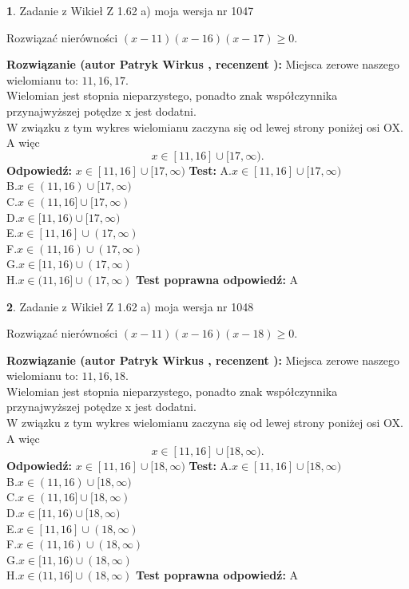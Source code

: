 \documentclass[12pt, a4paper]{article}
\theoremstyle{definition} %
\newtheorem{zad}{}
\newcommand{\zadStart}[1]{\begin{zad}#1\newline}
\newcommand{\zadStop}{\end{zad}}
\newcommand{\rozwStart}[2]{\noindent \textbf{Rozwiązanie (autor #1 , recenzent #2): }\newline}
\newcommand{\rozwStop}{\newline}
\newcommand{\odpStart}{\noindent \textbf{Odpowiedź:}\newline}
\newcommand{\odpStop}{\newline}
\newcommand{\testStart}{\noindent \textbf{Test:}\newline}
\newcommand{\testStop}{\newline}
\newcommand{\kluczStart}{\noindent \textbf{Test poprawna odpowiedź:}\newline}
\newcommand{\kluczStop}{\newline}
\begin{document}
\zadStart{Zadanie z Wikieł Z 1.62 a) moja wersja nr 1047}

Rozwiązać nierówności $(x-11)(x-16)(x-17)\ge0$.
\zadStop
\rozwStart{Patryk Wirkus}{}
Miejsca zerowe naszego wielomianu to: $11, 16, 17$.\\
Wielomian jest stopnia nieparzystego, ponadto znak współczynnika przy\linebreak najwyższej potędze x jest dodatni.\\ W związku z tym wykres wielomianu zaczyna się od lewej strony poniżej osi OX. A więc $$x \in [11,16] \cup [17,\infty).$$
\rozwStop
\odpStart
$x \in [11,16] \cup [17,\infty)$
\odpStop
\testStart
A.$x \in [11,16] \cup [17,\infty)$\\
B.$x \in (11,16) \cup [17,\infty)$\\
C.$x \in (11,16] \cup [17,\infty)$\\
D.$x \in [11,16) \cup [17,\infty)$\\
E.$x \in [11,16] \cup (17,\infty)$\\
F.$x \in (11,16) \cup (17,\infty)$\\
G.$x \in [11,16) \cup (17,\infty)$\\
H.$x \in (11,16] \cup (17,\infty)$
\testStop
\kluczStart
A
\kluczStop



\zadStart{Zadanie z Wikieł Z 1.62 a) moja wersja nr 1048}

Rozwiązać nierówności $(x-11)(x-16)(x-18)\ge0$.
\zadStop
\rozwStart{Patryk Wirkus}{}
Miejsca zerowe naszego wielomianu to: $11, 16, 18$.\\
Wielomian jest stopnia nieparzystego, ponadto znak współczynnika przy\linebreak najwyższej potędze x jest dodatni.\\ W związku z tym wykres wielomianu zaczyna się od lewej strony poniżej osi OX. A więc $$x \in [11,16] \cup [18,\infty).$$
\rozwStop
\odpStart
$x \in [11,16] \cup [18,\infty)$
\odpStop
\testStart
A.$x \in [11,16] \cup [18,\infty)$\\
B.$x \in (11,16) \cup [18,\infty)$\\
C.$x \in (11,16] \cup [18,\infty)$\\
D.$x \in [11,16) \cup [18,\infty)$\\
E.$x \in [11,16] \cup (18,\infty)$\\
F.$x \in (11,16) \cup (18,\infty)$\\
G.$x \in [11,16) \cup (18,\infty)$\\
H.$x \in (11,16] \cup (18,\infty)$
\testStop
\kluczStart
A
\kluczStop
\end{document}
